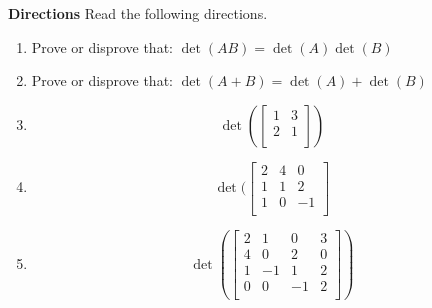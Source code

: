 \documentclass[12pt]{article}
\begin{document}
\textbf{Directions} Read the following directions. 
\begin{enumerate}
    \item Prove or disprove that: $\det(AB) = \det(A)\det(B)$
    \vspace{4cm}
    \item Prove or disprove that: $\det(A + B) = \det(A) + \det(B)$
    \vspace{4cm}
    \item 
    $$ \det (\begin{bmatrix} 
    1 & 3 \\
    2 & 1 \\
    \end{bmatrix}) $$
    \vspace{3cm}
    \item $$ \det(\begin{bmatrix} 
    2 & 4 & 0 \\
    1 & 1 & 2 \\
    1 & 0 & -1 \\
    \end{bmatrix}$$
    \clearpage
    \item 
    $$\det( 
    \begin{bmatrix}
    2 & 1 & 0 & 3 \\
    4 & 0 & 2 & 0 \\
    1 & -1 & 1 & 2 \\
    0 & 0 & -1 & 2 \\
    \end{bmatrix}) $$
    \vspace{4cm}
\end{enumerate}
\end{document}
